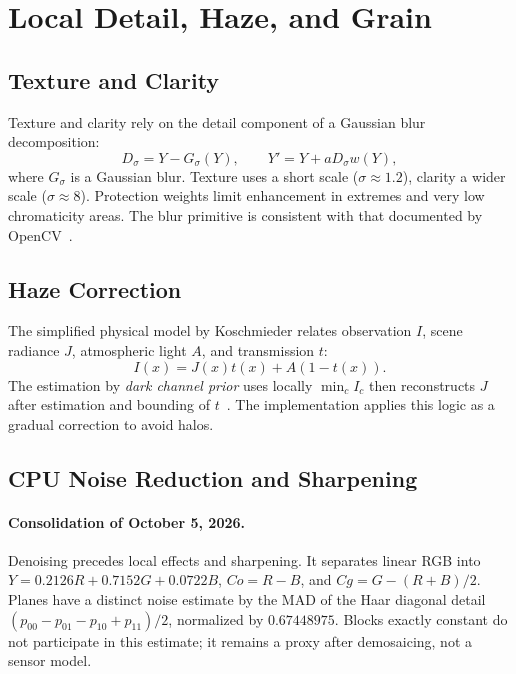 \section{Local Detail, Haze, and Grain}

\subsection{Texture and Clarity}

Texture and clarity rely on the detail component of a Gaussian blur decomposition:
\begin{equation}
  D_\sigma = Y-G_\sigma(Y), \qquad Y'=Y+aD_\sigma w(Y),
\end{equation}
where $G_\sigma$ is a Gaussian blur. Texture uses a short scale ($\sigma\approx1.2$), clarity a wider scale ($\sigma\approx8$). Protection weights limit enhancement in extremes and very low chromaticity areas. The blur primitive is consistent with that documented by OpenCV~\cite{opencvGaussian}.

\subsection{Haze Correction}

The simplified physical model by Koschmieder relates observation $I$, scene radiance $J$, atmospheric light $A$, and transmission $t$:
\begin{equation}
  I(x)=J(x)t(x)+A(1-t(x)).
\end{equation}
The estimation by \emph{dark channel prior} uses locally $\min_c I_c$ then reconstructs $J$ after estimation and bounding of $t$~\cite{he2009,he2011}. The implementation applies this logic as a gradual correction to avoid halos.

\subsection{CPU Noise Reduction and Sharpening}

\paragraph{Consolidation of October 5, 2026.}

Denoising precedes local effects and sharpening. It separates linear RGB into $Y=0.2126R+0.7152G+0.0722B$, $Co=R-B$, and $Cg=G-(R+B)/2$. Planes have a distinct noise estimate by the MAD of the Haar diagonal detail $(p_{00}-p_{01}-p_{10}+p_{11})/2$, normalized by $0.67448975$. Blocks exactly constant do not participate in this estimate; it remains a proxy after demosaicing, not a sensor model.

